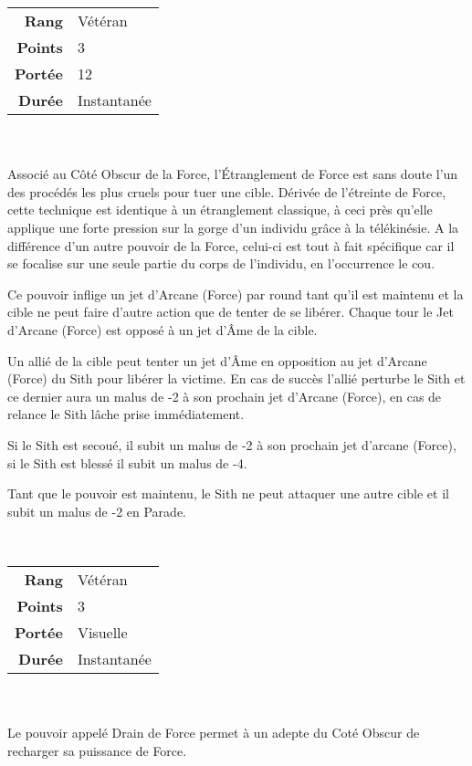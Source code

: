 \begin{description}[align=left]
        \begin{tabular}{ r l }
            \textbf{Rang}    & Vétéran \\
            \textbf{Points}  & 3 \\
            \textbf{Portée}  & 12 \\
            \textbf{Durée}   & Instantanée \\
        \end{tabular}
        \\ \\
        Associé au Côté Obscur de la Force, l’Étranglement de Force est sans doute l’un des procédés les plus cruels pour tuer une cible. Dérivée de l’étreinte de Force, cette technique est identique à un étranglement classique, à ceci près qu’elle applique une forte pression sur la gorge d’un individu grâce à la télékinésie. A la différence d’un autre pouvoir de la Force, celui-ci est tout à fait spécifique car il se focalise sur une seule partie du corps de l’individu, en l’occurrence le cou. 

        Ce pouvoir inflige un jet d’Arcane (Force) par round tant qu’il est maintenu et la cible ne peut faire d’autre action que de tenter de se libérer. Chaque tour le Jet d’Arcane (Force) est opposé à un jet d’\^Ame de la cible.

        Un allié de la cible peut tenter un jet d’\^Ame en opposition au jet d’Arcane (Force) du Sith pour libérer la victime. En cas de succès l’allié perturbe le Sith et ce dernier aura un malus de -2 à son prochain jet d’Arcane (Force), en cas de relance le Sith lâche prise immédiatement.

        Si le Sith est secoué, il subit un malus de -2 à son prochain jet d’arcane (Force), si le Sith est blessé il subit un malus de -4.

        Tant que le pouvoir est maintenu, le Sith ne peut attaquer une autre cible et il subit un malus de -2 en Parade.
        \\

    \item [Drain de Force] ~ \\

        \begin{tabular}{ r l }
            \textbf{Rang}    & Vétéran \\
            \textbf{Points}  & 3 \\
            \textbf{Portée}  & Visuelle \\
            \textbf{Durée}   & Instantanée \\
        \end{tabular}
        \\ \\
        Le pouvoir appelé Drain de Force permet à un adepte du Coté Obscur de recharger sa puissance de Force.


\end{description}

